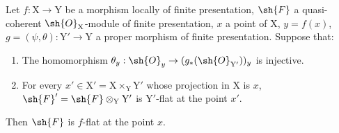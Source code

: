 \begin{proposition}[11.5.3]
\label{IV.11.5.3}
Let $f:\mathrm{X}\to\mathrm{Y}$ be a morphism locally of finite presentation,
$\sh{F}$ a quasi-coherent $\sh{O}_\mathrm{X}$-module of finite presentation, $x$ a point of $\mathrm{X}$, $y=f(x)$, $g=(\psi,\theta):\mathrm{Y}'\to\mathrm{Y}$
a proper morphism of finite presentation. Suppose that:
\begin{enumerate}[label=(\roman*)]
  \item The homomorphism $\theta_y:\sh{O}_y\to(g_*(\sh{O}_{\mathrm{Y}'}))_y$ is injective.
  \item For every $x'\in\mathrm{X}'=\mathrm{X}\times_\mathrm{Y}\mathrm{Y}'$ whose projection in $\mathrm{X}$ is $x$, $\sh{F}'=\sh{F}\otimes_\mathrm{Y}\mathrm{Y}'$ is
  $\mathrm{Y}'$-flat at the point $x'$.
\end{enumerate}

Then $\sh{F}$ is $f$-flat at the point $x$.
\end{proposition}

